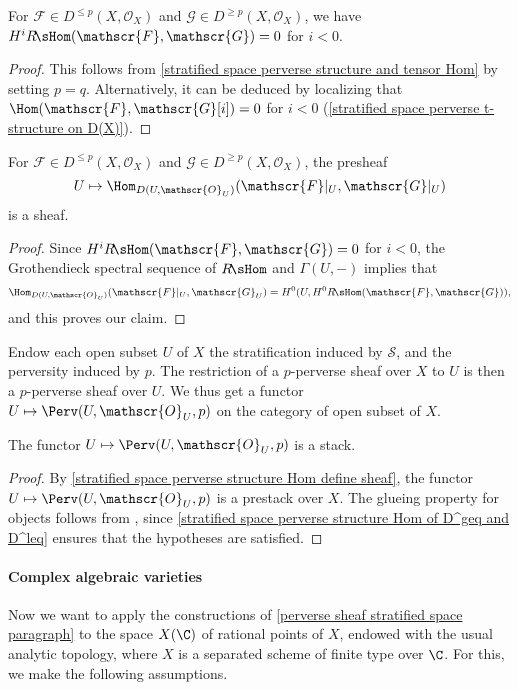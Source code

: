 \begin{corollary}\label{stratified space perverse structure Hom of D^geq and D^leq}
For $\mathscr{F}\in D^{\leq p}(X,\mathscr{O}_X)$ and $\mathscr{G}\in D^{\geq p}(X,\mathscr{O}_X)$, we have $H^iR\!\sHom(\mathscr{F},\mathscr{G})=0$ for $i<0$.
\end{corollary}
\begin{proof}
This follows from \cref{stratified space perverse structure and tensor Hom} by setting $p=q$. Alternatively, it can be deduced by localizing that $\Hom(\mathscr{F},\mathscr{G}[i])=0$ for $i<0$ (\cref{stratified space perverse t-structure on D(X)}).
\end{proof}

\begin{corollary}\label{stratified space perverse structure Hom define sheaf}
For $\mathscr{F}\in D^{\leq p}(X,\mathscr{O}_X)$ and $\mathscr{G}\in D^{\geq p}(X,\mathscr{O}_X)$, the presheaf
\[U\mapsto\Hom_{D(U,\mathscr{O}_U)}(\mathscr{F}|_U,\mathscr{G}|_U)\]
is a sheaf.
\end{corollary}
\begin{proof}
Since $H^iR\!\sHom(\mathscr{F},\mathscr{G})=0$ for $i<0$, the Grothendieck spectral sequence of $R\!\sHom$ and $\Gamma(U,-)$ implies that
\[\Hom_{D(U,\mathscr{O}_U)}(\mathscr{F}|_U,\mathscr{G}_U)=H^0(U,H^0R\!\sHom(\mathscr{F},\mathscr{G})),\]
and this proves our claim.
\end{proof}

Endow each open subset $U$ of $X$ the stratification induced by $\mathcal{S}$, and the perversity induced by $p$. The restriction of a $p$-perverse sheaf over $X$ to $U$ is then a $p$-perverse sheaf over $U$. We thus get a functor $U\mapsto\Perv(U,\mathscr{O}_U,p)$ on the category of open subset of $X$.
\begin{corollary}\label{stratified space perverse sheaf is stack}
The functor $U\mapsto\Perv(U,\mathscr{O}_U,p)$ is a stack.
\end{corollary}
\begin{proof}
By \cref{stratified space perverse structure Hom define sheaf}, the functor $U\mapsto\Perv(U,\mathscr{O}_U,p)$ is a prestack over $X$. The glueing property for objects follows from \cite[3.2.4]{BBD}, since \cref{stratified space perverse structure Hom of D^geq and D^leq} ensures that the hypotheses are satisfied.
\end{proof}

\paragraph{Complex algebraic varieties}\label{perverse sheaf complex variety paragraph}
Now we want to apply the constructions of \ref{perverse sheaf stratified space paragraph} to the space $X(\C)$ of rational points of $X$, endowed with the usual analytic topology, where $X$ is a separated scheme of finite type over $\C$. For this, we make the following assumptions.

